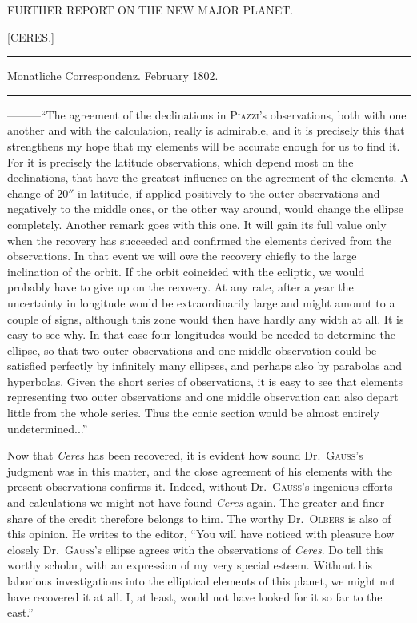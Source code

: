 \bigskip{}
\begin{center}
{\small FURTHER REPORT ON THE NEW MAJOR PLANET.\par}
[CERES.]\par
\medskip\hrule\medskip
Monatliche Correspondenz. February 1802.\par
\medskip\hrule
\end{center}\medskip
—\quad —\quad —\quad “The agreement of the declinations in \textsc{Piazzi}'s observations, both with one another and with the calculation, really is admirable, and it is precisely this that strengthens my hope that my elements will be accurate enough for us to find it. For it is precisely the latitude observations, which depend most on the declinations, that have the greatest influence on the agreement of the elements. A change of $20''$ in latitude, if applied positively to the outer observations and negatively to the middle ones, or the other way around, would change the ellipse completely. Another remark goes with this one. It will gain its full value only when the recovery has succeeded and confirmed the elements derived from the observations. In that event we will owe the recovery chiefly to the large inclination of the orbit. If the orbit coincided with the ecliptic, we would probably have to give up on the recovery. At any rate, after a year the uncertainty in longitude would be extraordinarily large and might amount to a couple of signs, although this zone would then have hardly any width at all. It is easy to see why. In that case four longitudes would be needed to determine the ellipse, so that two outer observations and one middle observation could be satisfied perfectly by infinitely many ellipses, and perhaps also by parabolas and hyperbolas. Given the short series of observations, it is easy to see
%
that elements representing two outer observations and one middle observation can also depart little from the whole series. Thus the conic section would be almost entirely undetermined...”

Now that \textit{Ceres} has been recovered, it is evident how sound Dr.\ \textsc{Gauss}'s judgment was in this matter, and the close agreement of his elements with the present observations confirms it. Indeed, without Dr.\ \textsc{Gauss}'s ingenious efforts and calculations we might not have found \textit{Ceres} again. The greater and finer share of the credit therefore belongs to him. The worthy Dr.\ \textsc{Olbers} is also of this opinion. He writes to the editor, “You will have noticed with pleasure how closely Dr.\ \textsc{Gauss}'s ellipse agrees with the observations of \textit{Ceres}. Do tell this worthy scholar, with an expression of my very special esteem. Without his laborious investigations into the elliptical elements of this planet, we might not have recovered it at all. I, at least, would not have looked for it so far to the east.”
\begin{flushright}\end{flushright}

